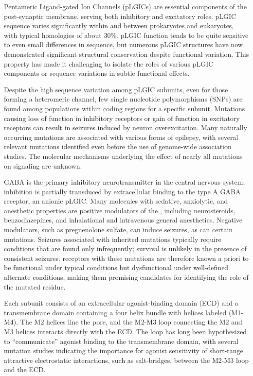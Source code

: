 \documentclass[journal=jacsat,manuscript=article]{achemso}
\begin{document}
  Pentameric Ligand-gated Ion Channels (pLGICs) are essential components of the post-synaptic membrane, serving both inhibitory and excitatory roles.  pLGIC sequence varies significantly within and between prokaryotes and eukaryotes,\cite{Jaiteh2016} with typical homologies of about 30\%.  pLGIC function tends to be quite sensitive to even small differences in sequence, but numerous pLGIC structures have now demonstrated significant structural conservation despite functional variation.  This property has made it challenging to isolate the roles of various pLGIC components or sequence variations in subtle functional effects.  
    
  Despite the high sequence variation among pLGIC subunits, even for those forming a heteromeric channel, few single nucleotide polymorphisms (SNPs) are found among populations within coding regions for a specific subunit.   Mutations causing loss of function in inhibitory receptors or gain of function in excitatory receptors can result in seizures induced by neuron overexcitation. Many naturally occurring mutations are associated with various forms of epilepsy\cite{Bianchi2002,Cossette2002,Kang2004,Macdonald2004}, with several relevant mutations identified even before the use of genome-wide association studies. The molecular mechanisms underlying the effect of nearly all mutations on signaling are unknown.

GABA is the primary inhibitory neurotransmitter in the central nervous system; inhibition is partially transduced by extracellular binding to the type A GABA receptor, an anionic pLGIC\cite{Olsen1990,Macdonald1994,Rabow1995}. Many molecules with sedative, anxiolytic, and anesthetic properties are positive modulators of the \GABAA, including neurosteroids\cite {Mihic1997,Belelli2005a, Mitchell2008,Lambert2009,Olsen2011a}, benzodiazepines\cite{Sigel1997}, and inhalational and intravenous general anesthetics\cite {Krasowski1999,Harris1995,Miller2002}. Negative modulators, such as pregnenolone sulfate\cite{Majewska1988}, can induce seizures, as can certain mutations. Seizures associated with inherited mutations typically require conditions that are found only infrequently; survival is unlikely in the presence of consistent seizures.  \GABAA receptors with these mutations are therefore known a priori to be functional under typical conditions but dysfunctional under well-defined alternate conditions, making them promising candidates for identifying the role of the mutated residue.   

Each subunit consists of an extracellular agonist-binding domain (ECD) and a transmembrane domain containing a four helix bundle with helices labeled (M1-M4).  The M2 helices line the pore, and the M2-M3 loop connecting the M2 and M3 helices interacts directly with the ECD.  The loop has long been hypothesized to ``communicate'' agonist binding to the transmembrane domain,\cite{Campos-Caro1996,Lynch1997,Grosman2000,Bera2002,Lummis2005,Law2005,Lee2005,Unwin2005, Lee2009} with several mutation studies indicating the importance for agonist sensitivity of short-range attractive electrostatic interactions, such as salt-bridges, between the M2-M3 loop and the ECD. \cite{Sigel1999, OShea2000, Kash2003, Hales2006} 
\end{document}
